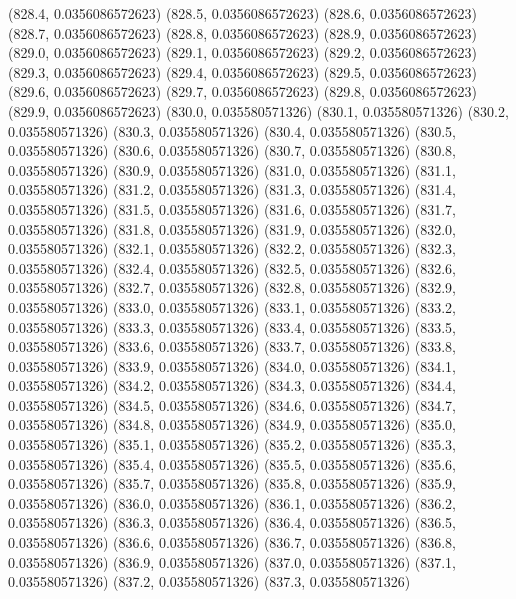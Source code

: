 {					(828.4, 0.0356086572623)
					(828.5, 0.0356086572623)
					(828.6, 0.0356086572623)
					(828.7, 0.0356086572623)
					(828.8, 0.0356086572623)
					(828.9, 0.0356086572623)
					(829.0, 0.0356086572623)
					(829.1, 0.0356086572623)
					(829.2, 0.0356086572623)
					(829.3, 0.0356086572623)
					(829.4, 0.0356086572623)
					(829.5, 0.0356086572623)
					(829.6, 0.0356086572623)
					(829.7, 0.0356086572623)
					(829.8, 0.0356086572623)
					(829.9, 0.0356086572623)
					(830.0, 0.035580571326)
					(830.1, 0.035580571326)
					(830.2, 0.035580571326)
					(830.3, 0.035580571326)
					(830.4, 0.035580571326)
					(830.5, 0.035580571326)
					(830.6, 0.035580571326)
					(830.7, 0.035580571326)
					(830.8, 0.035580571326)
					(830.9, 0.035580571326)
					(831.0, 0.035580571326)
					(831.1, 0.035580571326)
					(831.2, 0.035580571326)
					(831.3, 0.035580571326)
					(831.4, 0.035580571326)
					(831.5, 0.035580571326)
					(831.6, 0.035580571326)
					(831.7, 0.035580571326)
					(831.8, 0.035580571326)
					(831.9, 0.035580571326)
					(832.0, 0.035580571326)
					(832.1, 0.035580571326)
					(832.2, 0.035580571326)
					(832.3, 0.035580571326)
					(832.4, 0.035580571326)
					(832.5, 0.035580571326)
					(832.6, 0.035580571326)
					(832.7, 0.035580571326)
					(832.8, 0.035580571326)
					(832.9, 0.035580571326)
					(833.0, 0.035580571326)
					(833.1, 0.035580571326)
					(833.2, 0.035580571326)
					(833.3, 0.035580571326)
					(833.4, 0.035580571326)
					(833.5, 0.035580571326)
					(833.6, 0.035580571326)
					(833.7, 0.035580571326)
					(833.8, 0.035580571326)
					(833.9, 0.035580571326)
					(834.0, 0.035580571326)
					(834.1, 0.035580571326)
					(834.2, 0.035580571326)
					(834.3, 0.035580571326)
					(834.4, 0.035580571326)
					(834.5, 0.035580571326)
					(834.6, 0.035580571326)
					(834.7, 0.035580571326)
					(834.8, 0.035580571326)
					(834.9, 0.035580571326)
					(835.0, 0.035580571326)
					(835.1, 0.035580571326)
					(835.2, 0.035580571326)
					(835.3, 0.035580571326)
					(835.4, 0.035580571326)
					(835.5, 0.035580571326)
					(835.6, 0.035580571326)
					(835.7, 0.035580571326)
					(835.8, 0.035580571326)
					(835.9, 0.035580571326)
					(836.0, 0.035580571326)
					(836.1, 0.035580571326)
					(836.2, 0.035580571326)
					(836.3, 0.035580571326)
					(836.4, 0.035580571326)
					(836.5, 0.035580571326)
					(836.6, 0.035580571326)
					(836.7, 0.035580571326)
					(836.8, 0.035580571326)
					(836.9, 0.035580571326)
					(837.0, 0.035580571326)
					(837.1, 0.035580571326)
					(837.2, 0.035580571326)
					(837.3, 0.035580571326)
}
